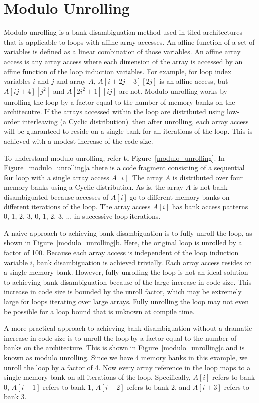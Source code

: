 \section{Modulo Unrolling}\label{sec:modulo_unrolling}

Modulo unrolling \cite{barua1999maps} is a bank disambiguation method used in tiled architectures that is applicable to loops with affine array accesses. An affine function of a set of variables is defined as a linear combination of those variables. An affine array access is any array access where each dimension of the array is accessed by an affine function of the loop induction variables. For example, for loop index variables $i$ and $j$ and array $A$,  $A[i+2j+3][2j]$ is an affine access, but $A[ij+4][j^2]$ and $A[2i^2+1][ij]$ are not. Modulo unrolling works by unrolling the loop by a factor equal to the number of memory banks on the architecutre. If the arrays accessed within the loop are distributed using low-order interleaving (a Cyclic distribution), then after unrolling, each array access will be guaranteed to reside on a single bank for all iterations of the loop. This is achieved with a modest increase of the code size. 

To understand modulo unrolling, refer to Figure~\ref{modulo_unrolling}. In Figure~\ref{modulo_unrolling}a there is a code fragment consisting of a sequential \textbf{for} loop with a single array access $A[i]$. The array $A$ is distributed over four memory banks using a Cyclic distribution. As is, the array $A$ is not bank disambiguated because accesses of $A[i]$ go to different memory banks on different iterations of the loop. The array access $A[i]$ has bank access patterns 0, 1, 2, 3, 0, 1, 2, 3, ... in successive loop iterations. 

A naive approach to achieving bank disambiguation is to fully unroll the loop, as shown in Figure~\ref{modulo_unrolling}b. Here, the original loop is unrolled by a factor of 100. Because each array access is independent of the loop induction variable $i$, bank disambiguation is achieved trivially. Each array access resides on a single memory bank. However, fully unrolling the loop is not an ideal solution to achieving bank disambiguation because of the large increase in code size. This increase in code size is bounded by the unroll factor, which may be extremely large for loops iterating over large arrays. Fully unrolling the loop may not even be possible for a loop bound that is unknown at compile time. 

A more practical approach to achieving bank disambiguation without a dramatic increase in code size is to unroll the loop by a factor equal to the number of banks on the architecture. This is shown in Figure~\ref{modulo_unrolling}c and is known as modulo unrolling. Since we have 4 memory banks in this example, we unroll the loop by a factor of 4. Now every array reference in the loop maps to a single memory bank on all iterations of the loop. Specifically, $A[i]$ refers to bank 0, $A[i+1]$ refers to bank 1, $A[i+2]$ refers to bank 2, and $A[i+3]$ refers to bank 3.

